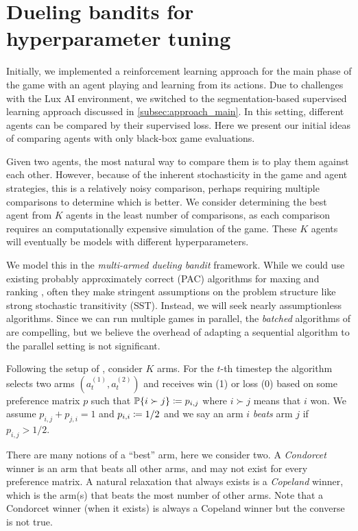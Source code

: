 \documentclass[10pt,twocolumn,letterpaper]{article}
\begin{document}
\clearpage

\section{Dueling bandits for hyperparameter tuning}
\label{subsec:bandit}

Initially, we implemented a reinforcement learning approach for the main
phase of the game with an agent playing and learning from its actions.
Due to challenges with the Lux AI environment, we
switched to the segmentation-based supervised learning
approach discussed in \autoref{subsec:approach_main}.
In this setting, different agents can be compared by their supervised loss.
Here we present our initial ideas of comparing
agents with only black-box game evaluations.

Given two agents, the most natural way to
compare them is to play them against each other.
However, because of the inherent stochasticity in the game and
agent strategies, this is a relatively noisy comparison, perhaps
requiring multiple comparisons to determine which is better.
We consider determining the best agent from \( K \) agents
in the least number of comparisons, as each comparison
requires an computationally expensive simulation of the game.
These \( K \) agents will eventually be models with different hyperparameters.

We model this in the \emph{multi-armed dueling bandit} framework.
While we could use existing probably approximately correct (PAC) algorithms
for maxing and ranking \cite{falahatgar2017maxing}, often they make stringent
assumptions on the problem structure like strong stochastic transitivity (SST).
Instead, we will seek nearly assumptionless algorithms.
Since we can run multiple games in parallel, the \emph{batched} algorithms
of \cite{agarwal2022batched, agarwal2022asymptotically} are compelling, but
we believe the overhead of adapting a sequential algorithm to the parallel
setting is not significant.

Following the setup of \cite{wu2016double}, consider \( K \) arms.
For the \( t \)-th timestep the algorithm selects two arms \( (a_t^{(1)},
a_t^{(2)}) \) and receives win (1) or loss (0) based on some preference
matrix \( p \) such that \( \operatorname{\mathbb{P}} \{ i \succ j \} \coloneqq p_{i, j} \) where
\( i \succ j \) means that \( i \) won.
We assume \( p_{i, j} + p_{j, i} = 1 \) and \( p_{i, i} \coloneqq 1/2 \) and
we say an arm \( i \) \emph{beats} arm \( j \) if \( p_{i, j} > 1/2 \).

There are many notions of a ``best'' arm, here we consider two.
A \emph{Condorcet} winner is an arm that beats all other
arms, and may not exist for every preference matrix.
A natural relaxation that always exists is a \emph{Copeland} winner,
which is the arm(s) that beats the most number of other arms.
Note that a Condorcet winner (when it exists) is
always a Copeland winner but the converse is not true.
\end{document}

